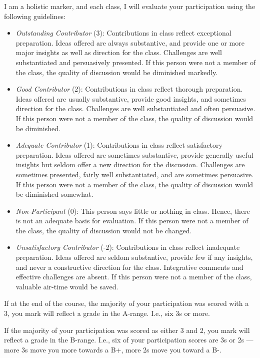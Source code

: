 \documentclass[]{book}
\theoremstyle{definition}
\theoremstyle{definition}
\theoremstyle{definition}
\theoremstyle{remark}
\begin{document}
I am a holistic marker, and each class, I will evaluate your
participation using the following guidelines:

\begin{itemize}
\item
  \emph{Outstanding Contributor} (3): Contributions in class reflect
  exceptional preparation. Ideas offered are always substantive, and
  provide one or more major insights as well as direction for the class.
  Challenges are well substantiated and persuasively presented. If this
  person were not a member of the class, the quality of discussion would
  be diminished markedly.
\item
  \emph{Good Contributor} (2): Contributions in class reflect thorough
  preparation. Ideas offered are usually substantive, provide good
  insights, and sometimes direction for the class. Challenges are well
  substantiated and often persuasive. If this person were not a member
  of the class, the quality of discussion would be diminished.
\item
  \emph{Adequate Contributor} (1): Contributions in class reflect
  satisfactory preparation. Ideas offered are sometimes substantive,
  provide generally useful insights but seldom offer a new direction for
  the discussion. Challenges are sometimes presented, fairly well
  substantiated, and are sometimes persuasive. If this person were not a
  member of the class, the quality of discussion would be diminished
  somewhat.
\item
  \emph{Non-Participant} (0): This person says little or nothing in
  class. Hence, there is not an adequate basis for evaluation. If this
  person were not a member of the class, the quality of discussion would
  not be changed.
\item
  \emph{Unsatisfactory Contributor} (-2): Contributions in class reflect
  inadequate preparation. Ideas offered are seldom substantive, provide
  few if any insights, and never a constructive direction for the class.
  Integrative comments and effective challenges are absent. If this
  person were not a member of the class, valuable air-time would be
  saved.
\end{itemize}

If at the end of the course, the majority of your participation was
scored with a 3, you mark will reflect a grade in the A-range. I.e., six
3s or more.

If the majority of your participation was scored as either 3 and 2, you
mark will reflect a grade in the B-range. I.e., six of your
participation scores are 3s or 2s --- more 3s move you more towards a
B+, more 2s move you toward a B-.
\end{document}

